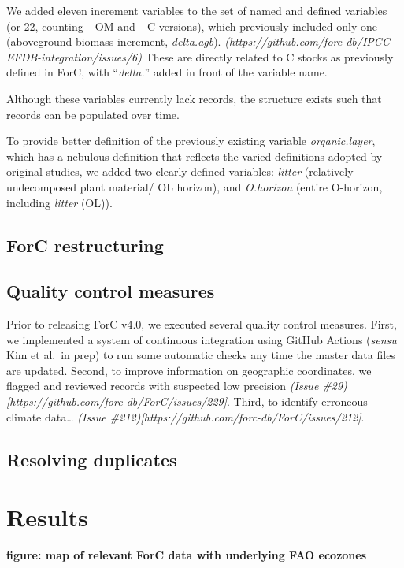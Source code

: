\documentclass[, manuscript]{copernicus}
\begin{document}
We added eleven increment variables to the set of named and defined
variables (or 22, counting \_OM and \_C versions), which previously
included only one (aboveground biomass increment, \emph{delta.agb}).
\emph{(https://github.com/forc-db/IPCC-EFDB-integration/issues/6)} These
are directly related to C stocks as previously defined in ForC, with
``\emph{delta.}'' added in front of the variable name.

Although these variables currently lack records, the structure exists
such that records can be populated over time.

To provide better definition of the previously existing variable
\emph{organic.layer}, which has a nebulous definition that reflects the
varied definitions adopted by original studies, we added two clearly
defined variables: \emph{litter} (relatively undecomposed plant
material/ OL horizon), and \emph{O.horizon} (entire O-horizon, including
\emph{litter} (OL)).

\subsection{ForC restructuring}

\subsection{Quality control measures}

Prior to releasing ForC v4.0, we executed several quality control
measures. First, we implemented a system of continuous integration using
GitHub Actions (\emph{sensu} Kim et al.~in prep) to run some automatic
checks any time the master data files are updated. Second, to improve
information on geographic coordinates, we flagged and reviewed records
with suspected low precision \emph{(Issue
\#29){[}https://github.com/forc-db/ForC/issues/229{]}}. Third, to
identify erroneous climate data\ldots{} \emph{(Issue
\#212){[}https://github.com/forc-db/ForC/issues/212{]}}.

\subsection{Resolving duplicates}

\section{Results}

\textbf{figure: map of relevant ForC data with underlying FAO ecozones}
\end{document}
